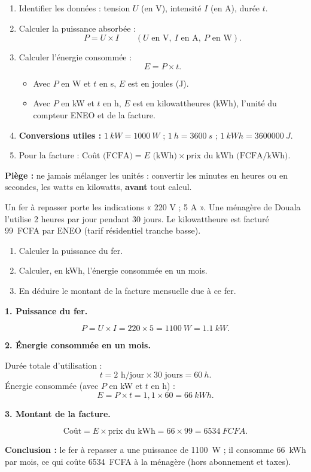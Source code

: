 \documentclass[11pt]{article}
\newcommand{\cle}[1]{{\popxbold\color{popdark}#1}}
\begin{document}
\begin{methode}
\begin{enumerate}
\item Identifier les données : tension $U$ (en V), intensité $I$ (en A), durée $t$.
\item Calculer la \cle{puissance} absorbée : \[ P = U \times I \qquad (U \text{ en V},\ I \text{ en A},\ P \text{ en W}). \]
\item Calculer l'\cle{énergie} consommée : \[ E = P \times t. \]
\begin{itemize}
\item Avec $P$ en W et $t$ en s, $E$ est en \cle{joules} (J).
\item Avec $P$ en kW et $t$ en h, $E$ est en \cle{kilowattheures} (kWh), l'unité du compteur ENEO et de la facture.
\end{itemize}
\item \textbf{Conversions utiles :} $\SI{1}{kW} = \SI{1000}{W}$ ; $\SI{1}{h} = \SI{3600}{s}$ ; $\SI{1}{kWh} = \SI{3 600 000}{J}$.
\item Pour la facture : $\text{Coût (FCFA)} = E \text{ (kWh)} \times \text{prix du kWh (FCFA/kWh)}$.
\end{enumerate}
\textbf{Piège :} ne jamais mélanger les unités : convertir les minutes en heures ou en secondes, les watts en kilowatts, \textbf{avant} tout calcul.
\end{methode}

\begin{exoresolu}
Un fer à repasser porte les indications « 220 V ; 5 A ». Une ménagère de Douala l'utilise 2 heures par jour pendant 30 jours. Le kilowattheure est facturé \SI{99}{FCFA} par ENEO (tarif résidentiel tranche basse).
\begin{enumerate}
\item Calculer la puissance du fer.
\item Calculer, en kWh, l'énergie consommée en un mois.
\item En déduire le montant de la facture mensuelle due à ce fer.
\end{enumerate}
\tcblower
\textbf{1. Puissance du fer.}

\[ P = U \times I = 220 \times 5 = \SI{1100}{W} = \SI{1,1}{kW}. \]

\textbf{2. Énergie consommée en un mois.}

Durée totale d'utilisation :
\[ t = 2 \text{ h/jour} \times 30 \text{ jours} = \SI{60}{h}. \]
Énergie consommée (avec $P$ en kW et $t$ en h) :
\[ E = P \times t = 1{,}1 \times 60 = \SI{66}{kWh}. \]

\textbf{3. Montant de la facture.}

\[ \text{Coût} = E \times \text{prix du kWh} = 66 \times 99 = \SI{6534}{FCFA}. \]

\textbf{Conclusion :} le fer à repasser a une puissance de \SI{1100}{W} ; il consomme \SI{66}{kWh} par mois, ce qui coûte \SI{6534}{FCFA} à la ménagère (hors abonnement et taxes).
\end{exoresolu}
\end{document}
